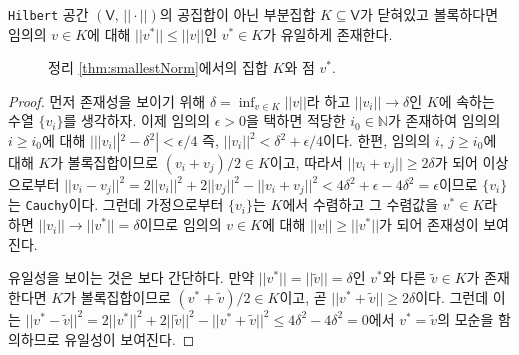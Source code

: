 \begin{theorem}\label{thm:smallestNorm}
    \texttt{Hilbert} 공간 $(\mathsf{V},\,||\cdot||)$의 공집합이 아닌 부분집합 $K\subseteq\mathsf{V}$가 닫혀있고 볼록하다면 임의의 $v\in K$에 대해 $||v^*||\leq||v||$인 $v^*\in K$가 유일하게 존재한다.
\end{theorem}

\begin{figure}[!ht]
    \sidecaption[b]
    \centering
    \caption{정리 \ref{thm:smallestNorm}에서의 집합 $K$와 점 $v^*$.}
\end{figure}

\begin{proof}
    먼저 존재성을 보이기 위해 $\delta=\inf_{v\in K}||v||$라 하고 $||v_i||\to\delta$인 $K$에 속하는 수열 $\{v_i\}$를 생각하자. 이제 임의의 $\epsilon>0$을 택하면 적당한 $i_0\in\mathbb{N}$가 존재하여 임의의 $i\geq i_0$에 대해 $|||v_i||^2-\delta^2|<\epsilon/4$ 즉, $||v_i||^2<\delta^2+\epsilon/4$이다. 한편, 임의의 $i,\,j\geq i_0$에 대해 $K$가 볼록집합이므로 $(v_i+v_j)/2\in K$이고, 따라서 $||v_i+v_j||\geq2\delta$가 되어 이상으로부터 $||v_i-v_j||^2=2||v_i||^2+2||v_j||^2-||v_i+v_j||^2<4\delta^2+\epsilon-4\delta^2=\epsilon$이므로 $\{v_i\}$는 \texttt{Cauchy}이다. 그런데 가정으로부터 $\{v_i\}$는 $K$에서 수렴하고 그 수렴값을 $v^*\in K$라 하면 $||v_i||\to||v^*||=\delta$이므로 임의의 $v\in K$에 대해 $||v||\geq||v^*||$가 되어 존재성이 보여진다.

    유일성을 보이는 것은 보다 간단하다. 만약 $||v^*||=||\widetilde{v}||=\delta$인 $v^*$와 다른 $\widetilde{v}\in K$가 존재한다면 $K$가 볼록집합이므로 $(v^*+\widetilde{v})/2\in K$이고, 곧 $||v^*+\widetilde{v}||\geq2\delta$이다. 그런데 이는 $||v^*-\widetilde{v}||^2=2||v^*||^2+2||\widetilde{v}||^2-||v^*+\widetilde{v}||^2\leq4\delta^2-4\delta^2=0$에서 $v^*=\widetilde{v}$의 모순을 함의하므로 유일성이 보여진다.
\end{proof}

